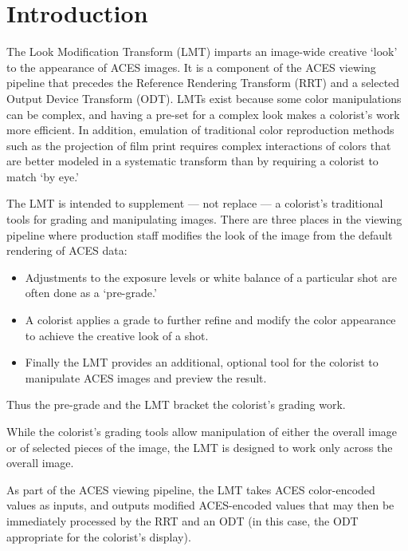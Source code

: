 \unnumberedformat	    %
\chapter{Introduction} 	%

The Look Modification Transform (LMT) imparts an image-wide creative `look' to the appearance of ACES images. It is a component of the ACES viewing pipeline that precedes the Reference Rendering Transform (RRT) and a selected Output Device Transform (ODT). LMTs exist because some color manipulations can be complex, and having a pre-set for a complex look makes a colorist's work more efficient. In addition, emulation of traditional color reproduction methods such as the projection of film print requires complex interactions of colors that are better modeled in a systematic transform than by requiring a colorist to match `by eye.'

The LMT is intended to supplement — not replace — a colorist's traditional tools for grading and manipulating images. There are three places in the viewing pipeline where production staff modifies the look of the image from the default rendering of ACES data:  

\begin{itemize}
    \item   Adjustments to the exposure levels or white balance of a particular shot are often done as a `pre-grade.'
    \item   A colorist applies a grade to further refine and modify the color appearance to achieve the creative look of a shot. 
    \item   Finally the LMT provides an additional, optional tool for the colorist to manipulate ACES images and preview the result.
\end{itemize}

Thus the pre-grade and the LMT bracket the colorist's grading work.

While the colorist's grading tools allow manipulation of either the overall image or of selected pieces of the image, the LMT is designed to work only across the overall image. 

As part of the ACES viewing pipeline, the LMT takes ACES color-encoded values as inputs, and outputs modified ACES-encoded values that may then be immediately processed by the RRT and an ODT (in this case, the ODT appropriate for the colorist’s display).

